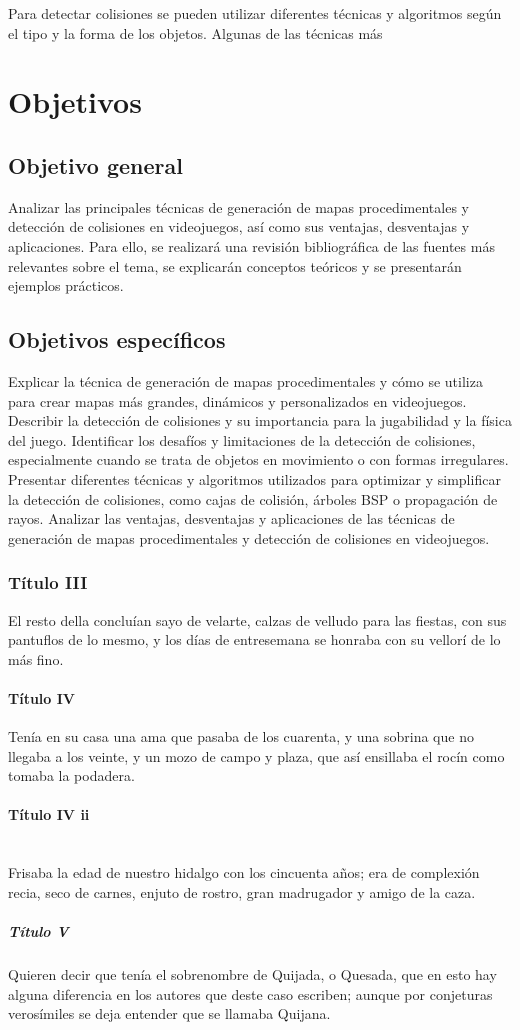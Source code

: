 \documentclass[stu, 12pt, letterpaper, donotrepeattitle, floatsintext, natbib]{apa7}
\newcommand{\myparagraph}[1]{\paragraph{#1}\mbox{}\\}
\begin{document}
Para detectar colisiones se pueden utilizar diferentes técnicas y algoritmos según el tipo y la forma de los objetos. Algunas de las técnicas más
\section{\large Objetivos}
\subsection{Objetivo general} 
Analizar las principales técnicas de generación de mapas procedimentales y detección de colisiones en videojuegos, así como sus ventajas, desventajas y aplicaciones. Para ello, se realizará una revisión bibliográfica de las fuentes más relevantes sobre el tema, se explicarán conceptos teóricos y se presentarán ejemplos prácticos.
\subsection{Objetivos específicos} 
Explicar la técnica de generación de mapas procedimentales y cómo se utiliza para crear mapas más grandes, dinámicos y personalizados en videojuegos.
Describir la detección de colisiones y su importancia para la jugabilidad y la física del juego.
Identificar los desafíos y limitaciones de la detección de colisiones, especialmente cuando se trata de objetos en movimiento o con formas irregulares.
Presentar diferentes técnicas y algoritmos utilizados para optimizar y simplificar la detección de colisiones, como cajas de colisión, árboles BSP o propagación de rayos.
Analizar las ventajas, desventajas y aplicaciones de las técnicas de generación de mapas procedimentales y detección de colisiones en videojuegos.
\subsubsection{Título III}
El resto della concluían sayo de velarte, calzas de velludo para las fiestas, con sus pantuflos de lo mesmo, y los días de entresemana se honraba con su vellorí de lo más fino.
\paragraph{Título IV}
Tenía en su casa una ama que pasaba de los cuarenta, y una sobrina que no llegaba a los veinte, y un mozo de campo y plaza, que así ensillaba el rocín como tomaba la podadera.
\myparagraph{Título IV ii}
Frisaba la edad de nuestro hidalgo con los cincuenta años; era de complexión recia, seco de carnes, enjuto de rostro, gran madrugador y amigo de la caza. 
\subparagraph{Título V}
Quieren decir que tenía el sobrenombre de Quijada, o Quesada, que en esto hay alguna diferencia en los autores que deste caso escriben; aunque por conjeturas verosímiles se deja entender que se llamaba Quijana.

\newpage
\renewcommand\refname{\large\textbf{Referencias}}

\end{document}
